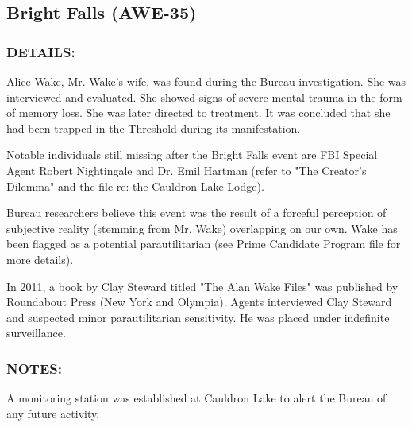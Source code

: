 \subsection*{Bright Falls (AWE-35)}
\subsubsection*{DETAILS:}
\par Alice Wake, Mr. Wake's wife, was found during the Bureau
investigation. She was interviewed and evaluated. She showed
signs of severe mental trauma in the form of 
memory
loss. She was later directed to treatment. It was concluded that
she had been trapped in the Threshold during its manifestation.
\par Notable individuals still missing after the Bright Falls event are FBI
Special Agent Robert Nightingale and Dr. Emil Hartman (refer to
"The Creator's Dilemma" and the file re: the Cauldron Lake
Lodge).
\par Bureau researchers believe this event was the result of a forceful
perception of subjective reality (stemming from Mr. Wake)
overlapping on our own. Wake has been flagged as a potential
parautilitarian (see Prime Candidate Program file for more details).
\par In 2011, a book by Clay Steward titled "The Alan Wake Files" was
published by Roundabout Press (New York and Olympia). Agents
interviewed Clay Steward and suspected minor parautilitarian
sensitivity. He was placed under indefinite surveillance.
\subsubsection*{NOTES:}
\par A monitoring station was established at Cauldron Lake to alert the
Bureau of any future activity.